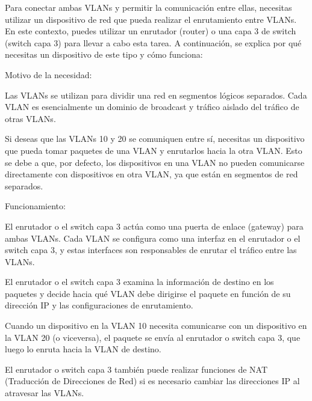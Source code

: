 \documentclass[a4paper]{article}
\begin{document}
\begin{enumerate}
Para conectar ambas VLANs y permitir la comunicación entre ellas, necesitas utilizar un dispositivo de red que pueda realizar el enrutamiento entre VLANs. En este contexto, puedes utilizar un enrutador (router) o una capa 3 de switch (switch capa 3) para llevar a cabo esta tarea. A continuación, se explica por qué necesitas un dispositivo de este tipo y cómo funciona:

Motivo de la necesidad:

Las VLANs se utilizan para dividir una red en segmentos lógicos separados. Cada VLAN es esencialmente un dominio de broadcast y tráfico aislado del tráfico de otras VLANs.

Si deseas que las VLANs 10 y 20 se comuniquen entre sí, necesitas un dispositivo que pueda tomar paquetes de una VLAN y enrutarlos hacia la otra VLAN. Esto se debe a que, por defecto, los dispositivos en una VLAN no pueden comunicarse directamente con dispositivos en otra VLAN, ya que están en segmentos de red separados.

Funcionamiento:

El enrutador o el switch capa 3 actúa como una puerta de enlace (gateway) para ambas VLANs. Cada VLAN se configura como una interfaz en el enrutador o el switch capa 3, y estas interfaces son responsables de enrutar el tráfico entre las VLANs.

El enrutador o el switch capa 3 examina la información de destino en los paquetes y decide hacia qué VLAN debe dirigirse el paquete en función de su dirección IP y las configuraciones de enrutamiento.

Cuando un dispositivo en la VLAN 10 necesita comunicarse con un dispositivo en la VLAN 20 (o viceversa), el paquete se envía al enrutador o switch capa 3, que luego lo enruta hacia la VLAN de destino.

El enrutador o switch capa 3 también puede realizar funciones de NAT (Traducción de Direcciones de Red) si es necesario cambiar las direcciones IP al atravesar las VLANs.


\end{enumerate}
\end{document}
